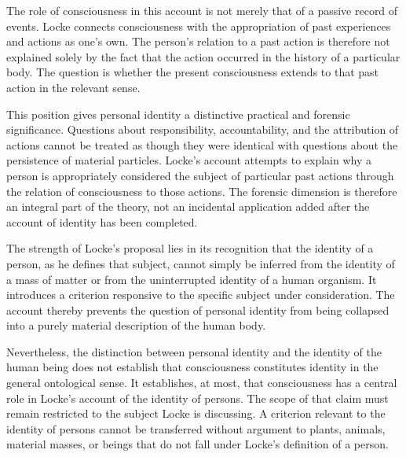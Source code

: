 \label{para:VS.B01.P01.C08.S08.SS07.P002}

The role of consciousness in this account is not
merely that of a passive record of events. Locke
connects consciousness with the appropriation of
past experiences and actions as one's own. The
person's relation to a past action is therefore
not explained solely by the fact that the action
occurred in the history of a particular body.
The question is whether the present consciousness
extends to that past action in the relevant sense.
\cite[II.xxvii.9--10]{LockeEssay}

\label{para:VS.B01.P01.C08.S08.SS07.P003}

This position gives personal identity a distinctive
practical and forensic significance. Questions
about responsibility, accountability, and the
attribution of actions cannot be treated as though
they were identical with questions about the
persistence of material particles. Locke's account
attempts to explain why a person is appropriately
considered the subject of particular past actions
through the relation of consciousness to those
actions. The forensic dimension is therefore an
integral part of the theory, not an incidental
application added after the account of identity
has been completed.

\label{para:VS.B01.P01.C08.S08.SS07.P004}

The strength of Locke's proposal lies in its
recognition that the identity of a person, as he
defines that subject, cannot simply be inferred
from the identity of a mass of matter or from
the uninterrupted identity of a human organism.
It introduces a criterion responsive to the
specific subject under consideration. The account
thereby prevents the question of personal identity
from being collapsed into a purely material
description of the human body.

\label{para:VS.B01.P01.C08.S08.SS07.P005}

Nevertheless, the distinction between personal
identity and the identity of the human being does
not establish that consciousness constitutes
identity in the general ontological sense. It
establishes, at most, that consciousness has a
central role in Locke's account of the identity
of persons. The scope of that claim must remain
restricted to the subject Locke is discussing.
A criterion relevant to the identity of persons
cannot be transferred without argument to plants,
animals, material masses, or beings that do not
fall under Locke's definition of a person.

